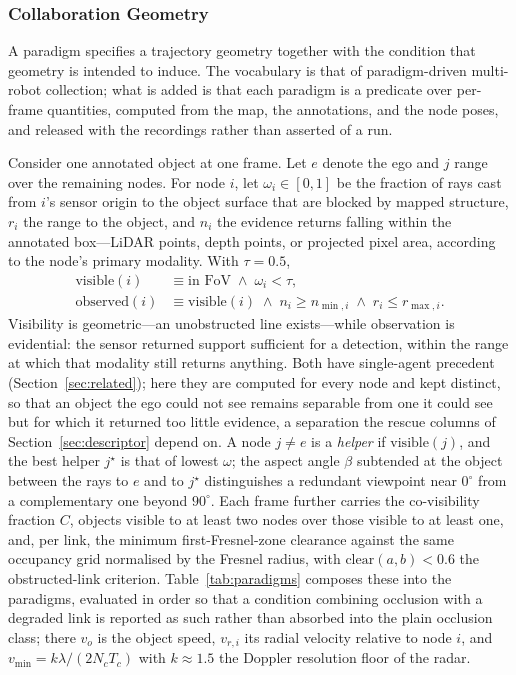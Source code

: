 
\subsubsection{Collaboration Geometry}
\label{sec:paradigms}

A paradigm specifies a trajectory geometry together with the condition that
geometry is intended to induce. The vocabulary is that of paradigm-driven
multi-robot collection; what is added is that each paradigm is a predicate over
per-frame quantities, computed from the map, the annotations, and the node
poses, and released with the recordings rather than asserted of a run.

Consider one annotated object at one frame. Let $e$ denote the ego and $j$ range
over the remaining nodes. For node $i$, let $\omega_i \in [0,1]$ be the fraction
of rays cast from $i$'s sensor origin to the object surface that are blocked by
mapped structure, $r_i$ the range to the object, and $n_i$ the evidence returns
falling within the annotated box---LiDAR points, depth points, or projected
pixel area, according to the node's primary modality. With $\tau = 0.5$,
%
\begin{align}
\mathrm{visible}(i) &\equiv \text{in FoV} \;\wedge\; \omega_i < \tau,
\label{eq:visible}\\
\mathrm{observed}(i) &\equiv \mathrm{visible}(i) \;\wedge\; n_i \ge n_{\min,i}
\;\wedge\; r_i \le r_{\max,i}.
\label{eq:observed}
\end{align}
%
Visibility is geometric---an unobstructed line exists---while observation is
evidential: the sensor returned support sufficient for a detection, within the
range at which that modality still returns anything. Both have single-agent
precedent (Section~\ref{sec:related}); here they are computed for every node and
kept distinct, so that an object the ego could not see remains separable from
one it could see but for which it returned too little evidence, a separation
the rescue columns of Section~\ref{sec:descriptor} depend on. A node $j \ne e$ is a
\emph{helper} if $\mathrm{visible}(j)$, and the best helper $j^\star$ is that of
lowest $\omega$; the aspect angle $\beta$ subtended at the object between the
rays to $e$ and to $j^\star$ distinguishes a redundant viewpoint near $0^\circ$
from a complementary one beyond $90^\circ$. Each frame further carries the
co-visibility fraction $C$, objects visible to at least two nodes over those
visible to at least one, and, per link, the minimum first-Fresnel-zone clearance
against the same occupancy grid normalised by the Fresnel radius, with
$\mathrm{clear}(a,b) < 0.6$ the obstructed-link criterion.
Table~\ref{tab:paradigms} composes these into the paradigms, evaluated in order
so that a condition combining occlusion with a degraded link is reported as such
rather than absorbed into the plain occlusion class; there $v_o$ is the object
speed, $v_{r,i}$ its radial velocity relative to node $i$, and
$v_{\min} = k\lambda / (2 N_c T_c)$ with $k \approx 1.5$ the Doppler resolution
floor of the radar.

